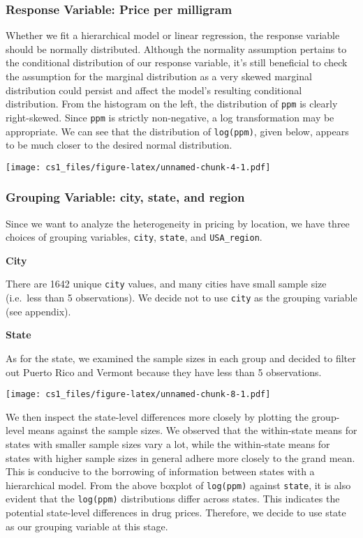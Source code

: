 \documentclass[
  11pt,
]{article}
\begin{document}
\hypertarget{response-variable-price-per-milligram}{%
\subsubsection{Response Variable: Price per
milligram}\label{response-variable-price-per-milligram}}

Whether we fit a hierarchical model or linear regression, the response
variable should be normally distributed. Although the normality
assumption pertains to the conditional distribution of our response
variable, it's still beneficial to check the assumption for the marginal
distribution as a very skewed marginal distribution could persist and
affect the model's resulting conditional distribution. From the
histogram on the left, the distribution of \texttt{ppm} is clearly
right-skewed. Since \texttt{ppm} is strictly non-negative, a log
transformation may be appropriate. We can see that the distribution of
\texttt{log(ppm)}, given below, appears to be much closer to the desired
normal distribution.

\texttt{[image: cs1\_files/figure-latex/unnamed-chunk-4-1.pdf]}

\hypertarget{grouping-variable-city-state-and-region}{%
\subsubsection{Grouping Variable: city, state, and
region}\label{grouping-variable-city-state-and-region}}

Since we want to analyze the heterogeneity in pricing by location, we
have three choices of grouping variables, \texttt{city}, \texttt{state},
and \texttt{USA\_region}.

\textbf{City}

There are 1642 unique \texttt{city} values, and many cities have small
sample size (i.e.~less than 5 observations). We decide not to use
\texttt{city} as the grouping variable (see appendix).

\textbf{State}

As for the state, we examined the sample sizes in each group and decided
to filter out Puerto Rico and Vermont because they have less than 5
observations.

\texttt{[image: cs1\_files/figure-latex/unnamed-chunk-8-1.pdf]}

We then inspect the state-level differences more closely by plotting the
group-level means against the sample sizes. We observed that the
within-state means for states with smaller sample sizes vary a lot,
while the within-state means for states with higher sample sizes in
general adhere more closely to the grand mean. This is conducive to the
borrowing of information between states with a hierarchical model. From
the above boxplot of \texttt{log(ppm)} against \texttt{state}, it is
also evident that the \texttt{log(ppm)} distributions differ across
states. This indicates the potential state-level differences in drug
prices. Therefore, we decide to use state as our grouping variable at
this stage.
\end{document}
